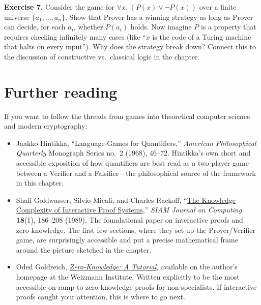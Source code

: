 \documentclass[11pt]{article}
\begin{document}
\bigskip
\textbf{Exercise 7.} \label{ex:games:7} Consider the game for $\forall x.\; (P(x) \vee \lnot P(x))$ over a finite universe $\{a_1, \ldots, a_n\}$. Show that Prover has a winning strategy as long as Prover can decide, for each $a_i$, whether $P(a_i)$ holds. Now imagine $P$ is a property that requires checking infinitely many cases (like ``$x$ is the code of a Turing machine that halts on every input''). Why does the strategy break down? Connect this to the discussion of constructive vs.\ classical logic in the chapter.

\section*{Further reading}

If you want to follow the threads from games into theoretical computer science and modern cryptography:

\begin{itemize}
  \item Jaakko Hintikka, ``Language-Games for Quantifiers,'' \emph{American Philosophical Quarterly} Monograph Series no.\ 2 (1968), 46--72. Hintikka's own short and accessible exposition of how quantifiers are best read as a two-player game between a Verifier and a Falsifier---the philosophical source of the framework in this chapter.
  \item Shafi Goldwasser, Silvio Micali, and Charles Rackoff, ``\href{https://people.csail.mit.edu/silvio/Selected\%20Scientific\%20Papers/Proof\%20Systems/The_Knowledge_Complexity_Of_Interactive_Proof_Systems.pdf}{The Knowledge Complexity of Interactive Proof Systems},'' \emph{SIAM Journal on Computing} \textbf{18}(1), 186--208 (1989). The foundational paper on interactive proofs and zero-knowledge. The first few sections, where they set up the Prover/Verifier game, are surprisingly accessible and put a precise mathematical frame around the picture sketched in the chapter.
  \item Oded Goldreich, \emph{\href{https://www.wisdom.weizmann.ac.il/~oded/zk-tut02.html}{Zero-Knowledge: A Tutorial}}, available on the author's homepage at the Weizmann Institute. Written explicitly to be the most accessible on-ramp to zero-knowledge proofs for non-specialists. If interactive proofs caught your attention, this is where to go next.
\end{itemize}
\end{document}
